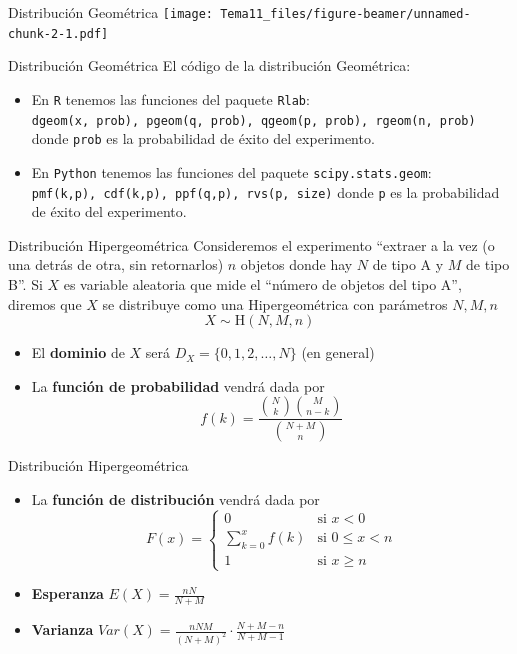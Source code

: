 \documentclass[
  ignorenonframetext,
]{beamer}
\providecommand{\tightlist}{%
  \setlength{\itemsep}{0pt}\setlength{\parskip}{0pt}}
\begin{document}
\begin{frame}{Distribución Geométrica}
\protect\hypertarget{distribuciuxf3n-geomuxe9trica-2}{}
\texttt{[image: Tema11\_files/figure-beamer/unnamed-chunk-2-1.pdf]}
\end{frame}

\begin{frame}[fragile]{Distribución Geométrica}
\protect\hypertarget{distribuciuxf3n-geomuxe9trica-3}{}
El código de la distribución Geométrica:

\begin{itemize}
\tightlist
\item
  En \texttt{R} tenemos las funciones del paquete \texttt{Rlab}:
  \texttt{dgeom(x,\ prob),\ pgeom(q,\ prob),\ qgeom(p,\ prob),\ rgeom(n,\ prob)}
  donde \texttt{prob} es la probabilidad de éxito del experimento.
\item
  En \texttt{Python} tenemos las funciones del paquete
  \texttt{scipy.stats.geom}:
  \texttt{pmf(k,p),\ cdf(k,p),\ ppf(q,p),\ rvs(p,\ size)} donde
  \texttt{p} es la probabilidad de éxito del experimento.
\end{itemize}
\end{frame}

\begin{frame}{Distribución Hipergeométrica}
\protect\hypertarget{distribuciuxf3n-hipergeomuxe9trica}{}
Consideremos el experimento ``extraer a la vez (o una detrás de otra,
sin retornarlos) \(n\) objetos donde hay \(N\) de tipo A y \(M\) de tipo
B''. Si \(X\) es variable aleatoria que mide el ``número de objetos del
tipo A'', diremos que \(X\) se distribuye como una Hipergeométrica con
parámetros \(N,M,n\) \[X\sim \text{H}(N,M,n)\]

\begin{itemize}
\tightlist
\item
  El \textbf{dominio} de \(X\) será \(D_X = \{0,1,2,\dots,N\}\) (en
  general)
\item
  La \textbf{función de probabilidad} vendrá dada por
  \[f(k) = \frac{{N\choose k}{M\choose n-k}}{N+M\choose n}\]
\end{itemize}
\end{frame}

\begin{frame}{Distribución Hipergeométrica}
\protect\hypertarget{distribuciuxf3n-hipergeomuxe9trica-1}{}
\begin{itemize}
\tightlist
\item
  La \textbf{función de distribución} vendrá dada por \[F(x) = \left\{
  \begin{array}{cl}
     0 & \text{si } x<0 
  \\ \sum_{k=0}^xf(k) & \text{si } 0\le x<n
  \\ 1 & \text{si } x\ge n
  \end{array}
  \right.\]
\item
  \textbf{Esperanza} \(E(X) = \frac{nN}{N+M}\)
\item
  \textbf{Varianza}
  \(Var(X) = \frac{nNM}{(N+M)^2}\cdot\frac{N+M-n}{N+M-1}\)
\end{itemize}
\end{frame}
\end{document}
